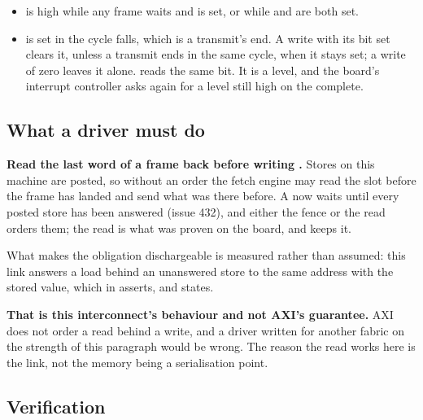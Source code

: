 \begin{itemize}
is told where the slot it is filling begins, and which slot that is
comes from the engine, so that a frame lands somewhere the driver is
not reading.
\item {} is high while any frame waits and
 is set, or while  and
 are both set.
\item {} is set in the cycle 
falls, which is a transmit's end. A write with its bit set clears it,
unless a transmit ends in the same cycle, when it stays set; a write
of zero leaves it alone.  reads the same bit. It is a level, and the board's
interrupt controller asks again for a level still high on the
complete.
\end{itemize}

\subsection*{What a driver must do}

\textbf{Read the last word of a frame back before writing
.} Stores on this machine are posted, so without
an order the fetch engine may read the slot before the frame has
landed and send what was there before. A  now waits
until every posted store has been answered (issue 432), and either
the fence or the read orders them; the read is what was proven on
the board, and  keeps it.

What makes the obligation dischargeable is measured rather than
assumed: this link answers a load behind an unanswered store to the
same address with the stored value, which
 in
 asserts, and 
states.

\textbf{That is this interconnect's behaviour and not AXI's
guarantee.} AXI does not order a read behind a write, and a driver
written for another fabric on the strength of this paragraph would be
wrong. The reason the read works here is the link, not the memory
being a serialisation point.

\subsection*{Verification}

